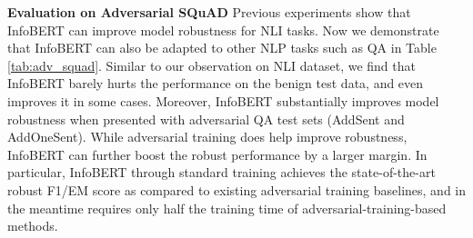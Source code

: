 \documentclass{article} \usepackage{iclr2021_conference,times}
\theoremstyle{definition}
\theoremstyle{remark}
\newcommand{\method}{InfoBERT\xspace}
\begin{document}
\textbf{Evaluation on Adversarial SQuAD} Previous experiments show that \method can improve model robustness for NLI tasks. Now we demonstrate that \method can also be adapted to other NLP tasks such as QA in Table \ref{tab:adv_squad}. Similar to our observation on NLI dataset, we find that \method barely hurts the performance on the benign test data, and even improves it in some cases. Moreover, \method substantially improves model robustness when presented with adversarial QA test sets (AddSent and AddOneSent). While adversarial training does help improve robustness, \method can further boost the robust performance by a larger margin. In particular, \method through standard training achieves the state-of-the-art robust F1/EM score as  compared to existing adversarial training baselines, and in the meantime requires only half the training time of adversarial-training-based methods. 
\end{document}
